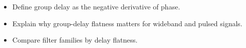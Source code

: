 \begin{objectives}
\begin{itemize}[leftmargin=1.4em,itemsep=2pt]
\item Define group delay as the negative derivative of phase.
\item Explain why group-delay flatness matters for wideband and pulsed signals.
\item Compare filter families by delay flatness.
\end{itemize}
\end{objectives}
